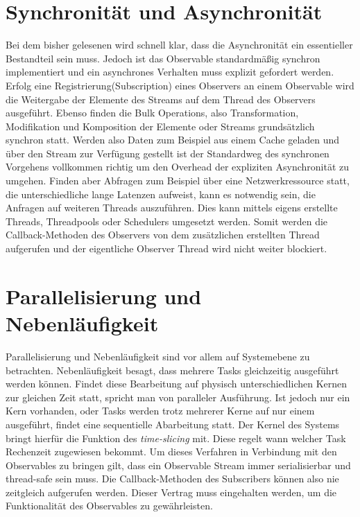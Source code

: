 \section{Synchronität und Asynchronität}
Bei dem bisher gelesenen wird schnell klar, dass die Asynchronität ein essentieller Bestandteil sein muss. Jedoch ist das Observable standardmäßig synchron implementiert und ein asynchrones Verhalten muss explizit gefordert werden. Erfolg eine Registrierung(Subscription) eines Observers an einem Observable wird die Weitergabe der Elemente des Streams auf dem Thread des Observers ausgeführt. Ebenso finden die Bulk Operations, also Transformation, Modifikation und Komposition der Elemente oder Streams grundsätzlich synchron statt. Werden also Daten zum Beispiel aus einem Cache geladen und über den Stream zur Verfügung gestellt ist der Standardweg des synchronen Vorgehens vollkommen richtig um den Overhead der expliziten Asynchronität zu umgehen. Finden aber Abfragen zum Beispiel über eine Netzwerkressource statt, die unterschiedliche lange Latenzen aufweist, kann es notwendig sein, die Anfragen auf weiteren Threads auszuführen. Dies kann mittels eigens erstellte Threads, Threadpools oder Schedulers umgesetzt werden. Somit werden die Callback-Methoden des Observers von dem zusätzlichen erstellten Thread aufgerufen und der eigentliche Observer Thread wird nicht weiter blockiert.
\section{Parallelisierung und Nebenläufigkeit}
Parallelisierung und Nebenläufigkeit sind vor allem auf Systemebene zu betrachten. Nebenläufigkeit besagt, dass mehrere Tasks gleichzeitig ausgeführt werden können. Findet diese Bearbeitung auf physisch unterschiedlichen Kernen zur gleichen Zeit statt, spricht man von paralleler Ausführung. Ist jedoch nur ein Kern vorhanden, oder Tasks werden trotz mehrerer Kerne auf nur einem ausgeführt, findet eine sequentielle Abarbeitung statt. Der Kernel des Systems bringt hierfür die Funktion des \textit{time-slicing} mit. Diese regelt wann welcher Task Rechenzeit zugewiesen bekommt. Um dieses Verfahren in Verbindung mit den Observables zu bringen gilt, dass ein Observable Stream immer serialisierbar und thread-safe sein muss. Die Callback-Methoden des Subscribers können also nie zeitgleich aufgerufen werden. Dieser Vertrag muss eingehalten werden, um die Funktionalität des Observables zu gewährleisten.

